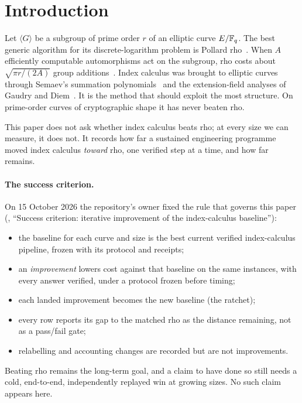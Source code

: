 \section{Introduction}\label{sec:intro}

Let $\langle G\rangle$ be a subgroup of prime order $r$ of an elliptic
curve $E/\mathbb{F}_q$. The best generic algorithm for its discrete-logarithm
problem is Pollard rho~\cite{pollard1978,vanoorschot1999}. When $A$
efficiently computable automorphisms act on the subgroup, rho costs about
$\sqrt{\pi r/(2A)}$ group additions~\cite{wiener1998,gallant2000}. Index
calculus was brought to elliptic curves through Semaev's summation
polynomials~\cite{semaev2004} and the extension-field analyses of Gaudry and
Diem~\cite{gaudry2009,diem2011}. It is the method that should exploit the
most structure. On prime-order curves of cryptographic shape it has never
beaten rho.

This paper does not ask whether index calculus beats rho; at every size we
can measure, it does not. It records how far a sustained engineering
programme moved index calculus \emph{toward} rho, one verified step at a
time, and how far remains.

\paragraph{The success criterion.} On 15 October 2026 the repository's owner
fixed the rule that governs this paper (, ``Success
criterion: iterative improvement of the index-calculus baseline''):
\begin{itemize}
\item the baseline for each curve and size is the best current verified
  index-calculus pipeline, frozen with its protocol and receipts;
\item an \emph{improvement} lowers cost against that baseline on the same
  instances, with every answer verified, under a protocol frozen before
  timing;
\item each landed improvement becomes the new baseline (the ratchet);
\item every row reports its gap to the matched rho as the distance
  remaining, not as a pass/fail gate;
\item relabelling and accounting changes are recorded but are not
  improvements.
\end{itemize}
Beating rho remains the long-term goal, and a claim to have done so still
needs a cold, end-to-end, independently replayed win at growing sizes. No
such claim appears here.

